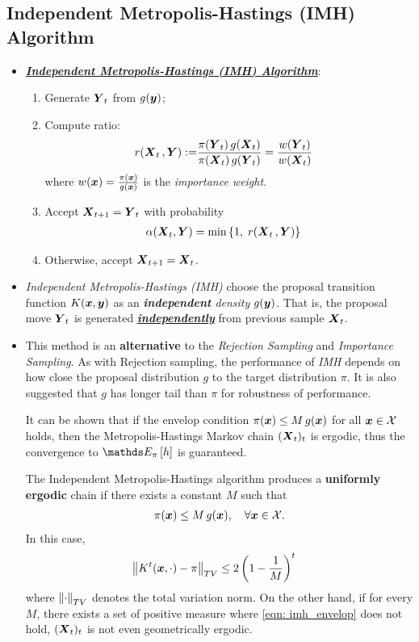 \documentclass[11pt]{article}
\begin{document}
\subsection{Independent Metropolis-Hastings (IMH) Algorithm}
\begin{itemize}
\item \underline{\emph{\textbf{Independent Metropolis-Hastings (IMH) Algorithm}}}:
\begin{enumerate}
\item Generate $\boldsymbol{Y}_t$ from $g(\boldsymbol{y})$;
\item Compute ratio:
\begin{align}
r(\boldsymbol{X}_{t}\,, \boldsymbol{Y}):= &\frac{\pi(\boldsymbol{Y}_t)\,g(\boldsymbol{X}_{t})}{\pi(\boldsymbol{X}_{t})\,g(\boldsymbol{Y}_t)} = \frac{w(\boldsymbol{Y}_t)}{w(\boldsymbol{X}_t)} \label{eqn: imh_hastings_ratio}
\end{align} where $w(\boldsymbol{x}) = \frac{\pi(\boldsymbol{x})}{g(\boldsymbol{x})}$ is the \emph{importance weight}.
\item Accept $\boldsymbol{X}_{t+1} = \boldsymbol{Y}_t$ with probability 
\begin{align*}
\alpha(\boldsymbol{X}_{t}, \boldsymbol{Y}) &= \min\left\{1,\;r(\boldsymbol{X}_{t}\,, \boldsymbol{Y})\right\}
\end{align*}
\item Otherwise, accept $\boldsymbol{X}_{t+1} = \boldsymbol{X}_{t}$.
\end{enumerate}

\item \emph{Independent Metropolis-Hastings (IMH)} choose the proposal transition function  $K(\boldsymbol{x}, \boldsymbol{y})$ as an \emph{\textbf{independent} density} $g(\boldsymbol{y})$. That is, the proposal move $\boldsymbol{Y}_t$ is generated \underline{\emph{\textbf{independently}}} from previous sample $\boldsymbol{X}_t$. 

\item This method is an \textbf{alternative} to the \emph{Rejection Sampling} and \emph{Importance Sampling}. As with Rejection sampling, the performance of \emph{IMH} depends on how close the proposal distribution $g$ to the target distribution $\pi$. It is also suggested that 
$g$ has longer tail than $\pi$ for robustness of performance. 

It can be shown that if the envelop condition $\pi(\boldsymbol{x}) \le M\,g(\boldsymbol{x})$ for all $\boldsymbol{x}\in {\mathcal X}$ holds, then the Metropolis-Hastings Markov chain $(\boldsymbol{X}_t)_t$ is ergodic, thus the convergence to $\E{\pi}{h}$ is guaranteed.

\begin{theorem}
The Independent Metropolis-Hastings algorithm produces a \textbf{uniformly ergodic} chain if there exists a constant $M$ such that
\begin{align}
\pi(\boldsymbol{x}) \le M\,g(\boldsymbol{x}), \quad \forall \boldsymbol{x}\in {\mathcal X}. \label{eqn: imh_envelop}
\end{align} In this case, 
\begin{align*}
\left\|K^{t}(\boldsymbol{x}, \cdot) - \pi\right\|_{TV} &\le 2\left(1- \frac{1}{M}\right)^t
\end{align*} where $\left\|\cdot\right\|_{TV}$ denotes the total variation norm. On the other hand, if for every $M$, there exists a set of positive measure where \eqref{eqn: imh_envelop} does not hold, $(\boldsymbol{X}_t)_t$ is not even geometrically ergodic.
\end{theorem}


\end{itemize}
\end{document}

